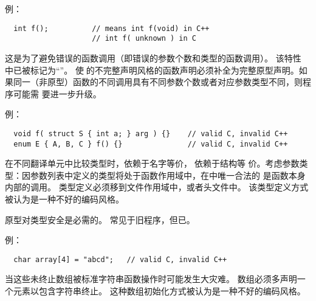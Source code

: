 例：
\begin{lstlisting}
  int f();          // means int f(void) in C++
                    // int f( unknown ) in C
\end{lstlisting}
\diffrat 这是为了避免错误的函数调用（即错误的参数个数和类型的函数调用）。
\diffeff \semchg 该特性在\c{}中已被标记为“\obsol”。
\diffdiff \syntrans 使用\c{}的不完整声明风格的函数声明必须补全为完整原型声明。如
果同一（非原型）函数的不同调用具有不同参数个数或者对应参数类型不同，则程序可能需
要进一步升级。
\diffuse \common

例：
\begin{lstlisting}
  void f( struct S { int a; } arg ) {}    // valid C, invalid C++
  enum E { A, B, C } f() {}               // valid C, invalid C++
\end{lstlisting}
\diffrat 在不同翻译单元中比较类型时，\cpp{}依赖于名字等价，而\c{}依赖于结构等
价。考虑参数类型：因参数列表中定义的类型将处于函数作用域中，在\cpp{}中唯一合法的
是函数本身内部的调用。
\diffeff \semdel
\diffdiff \semtrans 类型定义必须移到文件作用域中，或者头文件中。
\diffuse \seldom 该类型定义方式被认为是一种不好的编码风格。

\diffrat 原型对类型安全是必需的。
\diffeff \semdel
\diffdiff \syntrans
\diffuse 常见于旧程序，但已\obsol{}。

例：
\begin{lstlisting}
  char array[4] = "abcd";   // valid C, invalid C++
\end{lstlisting}
\diffrat 当这些未终止数组被标准字符串函数操作时可能发生大灾难。
\diffeff \semdel
\diffdiff \semtrans 数组必须多声明一个元素以包含字符串终止。
\diffuse \seldom 这种数组初始化方式被认为是一种不好的编码风格。

